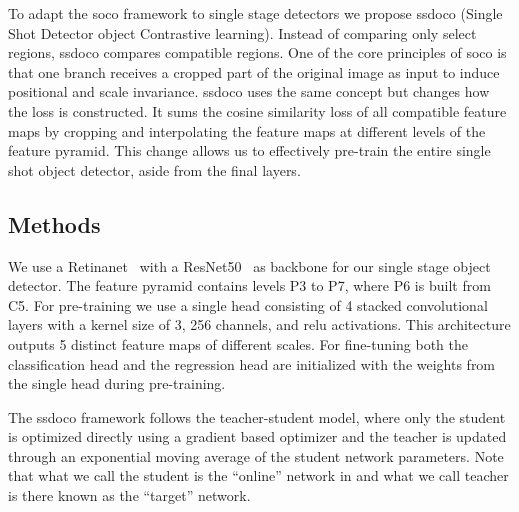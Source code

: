 To adapt the \acrshort{soco} framework to single stage detectors we propose \acrshort{ssdoco} (Single Shot Detector object Contrastive learning). Instead of comparing only select regions, \acrshort{ssdoco} compares compatible regions. One of the core principles of \acrshort{soco} is that one branch receives a cropped part of the original image as input to induce positional and scale invariance. \acrshort{ssdoco} uses the same concept but changes how the loss is constructed. It sums the cosine similarity loss of all compatible feature maps by cropping and interpolating the feature maps at different levels of the feature pyramid. This change allows us to effectively pre-train the entire single shot object detector, aside from the final layers.

\subsection{Methods}
We use a Retinanet~\cite{Lin:2017aaa} with a ResNet50~\cite{He:2015aaa} as backbone for our single stage object detector. The feature pyramid contains levels P3 to P7, where P6 is built from C5. For pre-training we use a single head consisting of 4 stacked convolutional layers with a kernel size of 3, 256 channels, and \acrshort{relu} activations. This architecture outputs 5 distinct feature maps of different scales. For fine-tuning both the classification head and the regression head are initialized with the weights from the single head during pre-training.

The \acrshort{ssdoco} framework follows the teacher-student model, where only the student is optimized directly using a gradient based optimizer and the teacher is updated through an exponential moving average of the student network parameters. Note that what we call the student is the ``online'' network in \cite{Wei:2021aaa} and what we call teacher is there known as the ``target'' network.

